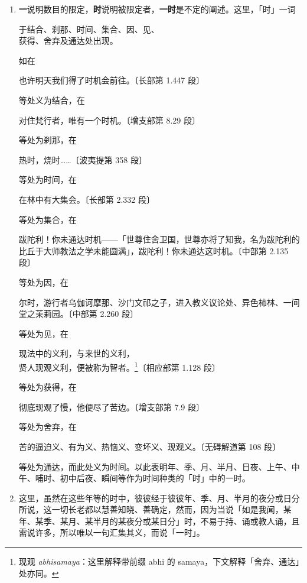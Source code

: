 \begin{enumerate}
\item \textbf{一}说明数目的限定，\textbf{时}说明被限定者，\textbf{一时}是不定的阐述。这里，「时」一词\begin{quoting}于结合、刹那、时间、集合、因、见、\\获得、舍弃及通达处出现。\end{quoting}如在\begin{quoting}也许明天我们得了时机会前往。{\bluefootnotesize 〔长部第 1.447 段〕}\end{quoting}等处义为结合，在\begin{quoting}对住梵行者，唯有一个时机。{\bluefootnotesize 〔增支部第 8.29 段〕}\end{quoting}等处为刹那，在\begin{quoting}热时，烧时……{\bluefootnotesize 〔波夷提第 358 段〕}\end{quoting}等处为时间，在\begin{quoting}在林中有大集会。{\bluefootnotesize 〔长部第 2.332 段〕}\end{quoting}等处为集合，在\begin{quoting}跋陀利！你未通达时机——「世尊住舍卫国，世尊亦将了知我，名为跋陀利的比丘于大师教法之学未能圆满」，跋陀利！你未通达这时机。{\bluefootnotesize 〔中部第 2.135 段〕}\end{quoting}等处为因，在\begin{quoting}尔时，游行者乌伽诃摩那、沙门文祁之子，进入教义议论处、异色柿林、一间堂之茉莉园。{\bluefootnotesize 〔中部第 2.260 段〕}\end{quoting}等处为见，在\begin{quoting}现法中的义利，与来世的义利，\\贤人现观义利，便被称为智者。\footnote{现观 \textit{abhisamaya}：这里解释带前缀 abhi 的 samaya，下文解释「舍弃、通达」处亦同。}{\bluefootnotesize 〔相应部第 1.128 段〕}\end{quoting}等处为获得，在\begin{quoting}彻底现观了慢，他便尽了苦边。{\bluefootnotesize 〔增支部第 7.9 段〕}\end{quoting}等处为舍弃，在\begin{quoting}苦的逼迫义、有为义、热恼义、变坏义、现观义。{\bluefootnotesize 〔无碍解道第 108 段〕}\end{quoting}等处为通达，而此处义为时间。以此表明年、季、月、半月、日夜、上午、中午、哺时、初中后夜、瞬间等作为时间种类的「时」中的一时。
\item 这里，虽然在这些年等的时中，彼彼经于彼彼年、季、月、半月的夜分或日分所说，这一切长老都以慧善知晓、善确定，然而，因为当说「如是我闻，某年、某季、某月、某半月的某夜分或某日分」时，不易于持、诵或教人诵，且需说许多，所以唯以一句汇集其义，而说「一时」。

\end{enumerate}
